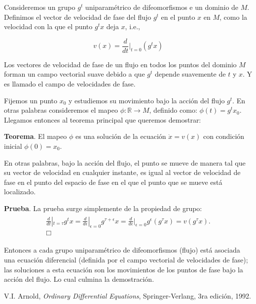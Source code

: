 \documentclass[a4paper,10pt]{article}
\numberwithin{equation}{section}
\begin{document}
\vspace{.3cm}

Consideremos un grupo $g^t$ uniparamétrico de difeomorfismos e un dominio
de $M$. Definimos el vector de velocidad de fase del flujo $g^t$ en el
punto $x$ en $M$, como la velocidad con la que el punto $g^t x$ deja $x$, i.e.,

\begin{equation}
 v(x) = \frac{d}{dt} |_{t=0} (g^t x)
\end{equation}

Los vectores de velocidad de fase de un flujo en todos los puntos del
dominio $M$ forman un campo vectorial suave debido a que $g^t$ depende
suavemente de $t$ y $x$. Y es llamado el campo de velocidades de 
fase. 

\vspace{.3cm}

Fijemos un punto $x_0$ y estudiemos su movimiento bajo la acción del
flujo $g^t$. En otras palabras consideremos el mapeo $\phi: \mathbb{R} \rightarrow M$, 
definido como: $\phi(t) = g^t x_0$. Llegamos entonces al teorema principal 
que queremos demostrar:

\vspace{.3cm}

\textbf{Teorema}. El mapeo $\phi$ es una solución de la ecuación $\dot{x}=v(x)$ 
con condición inicial $\phi(0)=x_0$.

En otras palabras, bajo la acción del flujo, el punto se mueve de manera
tal que su vector de velocidad en cualquier instante, es igual al vector de velocidad
de fase en el punto del espacio de fase en el que el punto que se mueve
está localizado.

\vspace{.3cm}

\textbf{Prueba}. La prueba surge simplemente de la propiedad de grupo:
\begin{align}
\begin{split}
 \frac{d}{dt}|_{t=\tau} g^t x =  \frac{d}{d\epsilon}|_{\epsilon=0} g^{\tau+\epsilon} x =
  \frac{d}{d\epsilon}|_{\epsilon=0} g^\epsilon (g^\tau x) = v(g^\tau x). \\
\Box
\end{split}
\end{align}

Entonces a cada grupo uniparamétrico de difeomorfismos (flujo) está asociada una 
ecuación diferencial (definida por el campo vectorial de velocidades de fase); las
soluciones a esta ecuación son los movimientos de los puntos de fase bajo la acción del
flujo. Lo cual culmina la demostración.

\vspace{.3cm}


\begin{thebibliography}{10}
 V.I. Arnold, \emph{Ordinary Differential Equations}, Springer-Verlang,
 3ra edición, 1992.
\end{thebibliography}
\end{document}
